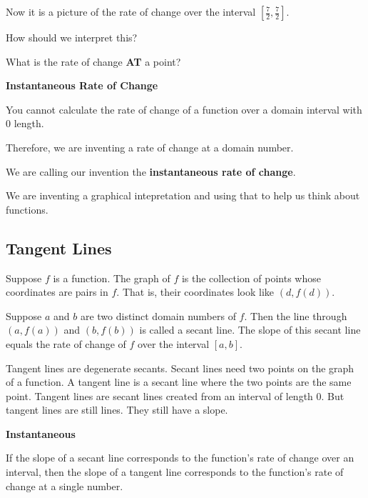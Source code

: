 \documentclass{ximera}
\begin{document}
Now it is a picture of the rate of change over the interval $\left[ \tfrac{7}{2}, \tfrac{7}{2} \right]$. 


How should we interpret this? 


What is the rate of change \textbf{\textcolor{red!70!darkgray}{AT}} a point? 






\begin{idea} \textbf{\textcolor{blue!55!black}{Instantaneous Rate of Change}} 

You cannot calculate the rate of change of a function over a domain interval with $0$ length.  

Therefore, we are inventing a rate of change at a domain number. 

We are calling our invention the \textbf{\textcolor{blue!55!black}{instantaneous rate of change}}.

We are inventing a graphical intepretation and using that to help us think about functions.

\end{idea}











\subsection*{Tangent Lines}

Suppose $f$ is a function.  The graph of $f$ is the collection of points whose coordinates are pairs in $f$.  That is, their coordinates look like $(d, f(d))$.

Suppose $a$ and $b$ are two distinct domain numbers of $f$.  Then the line through $(a, f(a))$ and $(b, f(b))$ is called a secant line.  The slope of this secant line equals the rate of change of $f$ over the interval $[a, b]$.

Tangent lines are degenerate secants. Secant lines need two points on the graph of a function.  A tangent line is a secant line where the two points are the same point. Tangent lines are secant lines created from an interval of length $0$.  But tangent lines are still lines.  They still have a slope.



\begin{conclusion} \textbf{\textcolor{green!25!black}{Instantaneous}}

If the slope of a secant line corresponds to the function's rate of change over an interval, then the slope of a tangent line corresponds to the function's rate of change at a single number.

\end{conclusion}
\end{document}
